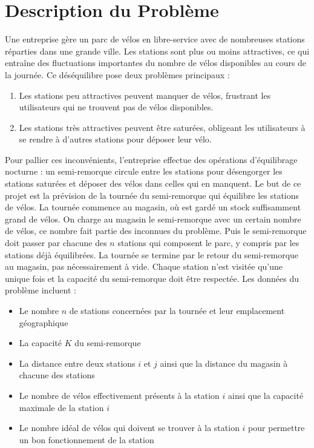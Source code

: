 \documentclass{article}
\begin{document}
\section{Description du Problème}
Une entreprise gère un parc de vélos en libre-service avec de nombreuses stations réparties dans une grande ville. Les stations sont plus ou moins attractives, ce qui entraîne des fluctuations importantes du nombre de vélos disponibles au cours de la journée. Ce déséquilibre pose deux problèmes principaux :
\begin{enumerate}
    \item Les stations peu attractives peuvent manquer de vélos, frustrant les utilisateurs qui ne trouvent pas de vélos disponibles.
    \item Les stations très attractives peuvent être saturées, obligeant les utilisateurs à se rendre à d'autres stations pour déposer leur vélo.
\end{enumerate}
Pour pallier ces inconvénients, l'entreprise effectue des opérations d'équilibrage nocturne : un semi-remorque circule entre les stations pour désengorger les stations saturées et déposer des vélos dans celles qui en manquent.
Le but de ce projet est la prévision de la tournée du semi-remorque qui équilibre les stations de vélos. La tournée commence au magasin, où est gardé un stock suffisamment grand de vélos. On charge au magasin le semi-remorque avec un certain nombre de vélos, ce nombre fait partie des inconnues du problème. Puis le semi-remorque doit passer par chacune des $n$ stations qui composent le parc, y compris par les stations déjà équilibrées. La tournée se termine par le retour du semi-remorque au magasin, pas nécessairement à vide. Chaque station n’est visitée qu’une unique fois et la capacité du semi-remorque doit être respectée.
Les données du problème incluent :
\begin{itemize}
    \item Le nombre $n$ de stations concernées par la tournée et leur emplacement géographique
    \item La capacité $K$ du semi-remorque
    \item La distance entre deux stations $i$ et $j$ ainsi que la distance du magasin à chacune des stations
    \item Le nombre de vélos effectivement présents à la station $i$ ainsi que la capacité maximale de la station $i$
    \item Le nombre idéal de vélos qui doivent se trouver à la station $i$ pour permettre un bon fonctionnement de la station
\end{itemize}
\end{document}
